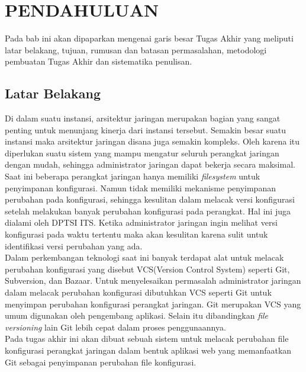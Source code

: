 \chapter{PENDAHULUAN}
	Pada bab ini akan dipaparkan mengenai garis besar Tugas Akhir yang meliputi latar belakang, tujuan, rumusan dan batasan permasalahan, metodologi pembuatan Tugas Akhir dan sistematika penulisan.
        
	\section{Latar Belakang}
		Di dalam suatu instansi, arsitektur jaringan merupakan bagian yang sangat penting untuk menunjang kinerja dari instansi tersebut. Semakin besar suatu instansi maka arsitektur jaringan disana juga semakin kompleks. Oleh karena itu diperlukan suatu sistem yang mampu mengatur seluruh perangkat jaringan dengan mudah, sehingga administrator jaringan dapat bekerja secara maksimal.\\
        \indent Saat ini beberapa perangkat jaringan hanya  memiliki \textit{filesystem}  untuk penyimpanan konfigurasi. Namun tidak memiliki mekanisme penyimpanan perubahan pada konfigurasi, sehingga kesulitan dalam melacak versi konfigurasi setelah melakukan banyak perubahan konfigurasi pada perangkat. Hal ini juga dialami oleh DPTSI ITS. Ketika administrator jaringan ingin melihat versi konfigurasi pada waktu tertentu maka akan kesulitan karena sulit untuk identifikasi versi perubahan yang ada.\\
        \indent Dalam perkembangan teknologi saat ini banyak terdapat alat untuk melacak perubahan konfigurasi yang disebut VCS(Version Control System) seperti Git, Subversion, dan Bazaar. Untuk menyelesaikan permasalah administrator jaringan dalam melacak perubahan konfigurasi dibutuhkan VCS seperti Git untuk menyimpan perubahan konfigurasi perangkat jaringan. Git merupakan VCS yang umum digunakan oleh pengembang aplikasi\cite{versioning_popularity}. Selain itu dibandingkan \textit{file versioning} lain Git lebih cepat dalam proses penggunaannya\cite{git_fast}.\\
	    \indent Pada tugas akhir ini akan dibuat sebuah sistem untuk melacak perubahan file konfigurasi perangkat jaringan dalam bentuk aplikasi web  yang memanfaatkan Git sebagai penyimpanan perubahan file konfigurasi. 


